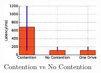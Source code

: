 \begin{figure}[t]
      \includegraphics[width=0.45\textwidth]{plots/contention_bar}
      \caption{Contention vs No Contention}
      \label{fig:gizacontentionbar}
\end{figure}